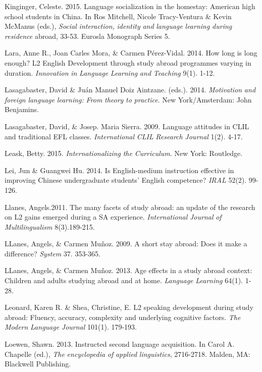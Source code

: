 Kinginger, Celeste. 2015. Language socialization in the homestay: American high school students in China. In Ros Mitchell, Nicole Tracy-Ventura \& Kevin McManus (eds.), \textit{Social} \textit{interaction,} \textit{identity} \textit{and} \textit{language} \textit{learning} \textit{during} \textit{residence} abroad, 33-53. Eurosla Monograph Series 5.

Lara, Anne R., Joan Carles Mora, \& Carmen Pérez-Vidal. 2014. How long is long enough? L2 English Development through study abroad programmes varying in duration. \textit{Innovation} \textit{in} \textit{Language} \textit{Learning} \textit{and} \textit{Teaching} 9(1). 1-12. 

Lasagabaster, David \& Juán Manuel Doiz Aintzane. (eds.). 2014. \textit{Motivation} \textit{and} \textit{foreign} \textit{language} \textit{learning:} \textit{From} \textit{theory} \textit{to} \textit{practice}. New York/Amsterdam: John Benjamins. 

Lasagabaster, David, \& Josep. Maria Sierra. 2009. Language attitudes in CLIL and traditional EFL classes. \textit{International} \textit{CLIL} \textit{Research} \textit{Journal} 1(2). 4-17.

Leask, Betty. 2015. \textit{Internationalizing} \textit{the} \textit{Curriculum}. New York: Routledge.

Lei, Jun \& Guangwei Hu. 2014. Is English-medium instruction effective in improving Chinese undergraduate students’ English competence? \textit{IRAL} 52(2). 99-126.

Llanes, Angels.2011. The many facets of study abroad: an update of the research on L2 gains emerged during a SA experience. \textit{International} \textit{Journal} \textit{of} \textit{Multilingualism} 8(3).189-215. 

LLanes, Angels, \& Carmen Muñoz. 2009. A short stay abroad: Does it make a difference? \textit{System} 37. 353-365.

LLanes, Angels, \& Carmen Muñoz. 2013. Age effects in a study abroad context: Children and adults studying abroad and at home. \textit{Language} \textit{Learning} 64(1). 1-28.

Leonard,  Karen R. \& Shea, Christine, E. L2 speaking development during study abroad: Fluency, accuracy, complexity and underlying cognitive factors. \textit{The} \textit{Modern} \textit{Language} \textit{Journal} 101(1). 179-193.

Loewen, Shawn. 2013. Instructed second language acquisition. In Carol A. Chapelle (ed.), \textit{The} \textit{encyclopedia} \textit{of} \textit{applied} \textit{linguistics}, 2716-2718. Malden, MA: Blackwell Publishing.

